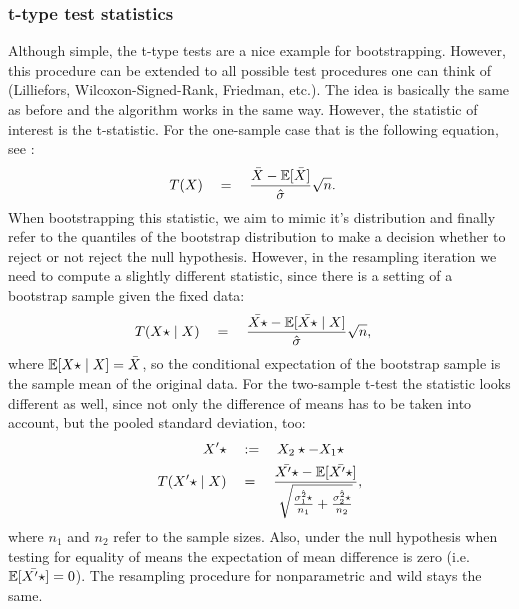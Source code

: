 	\subsubsection*{t-type test statistics}
Although simple, the t-type tests are a nice example for bootstrapping. However, this procedure can be extended to all possible test procedures one can think of (Lilliefors, Wilcoxon-Signed-Rank, Friedman, etc.). The idea is basically the same as before and the algorithm works in the same way. However, the statistic of interest is the t-statistic. For the one-sample case that is the following equation, see \citet{t}:
\begin{align*}
	T(X) \quad &= \quad \frac{\bar{X} - \mathbb{E}[\bar{X}]}{\hat{\sigma}}\sqrt{n}.
\end{align*}
When bootstrapping this statistic, we aim to mimic it's distribution and finally refer to the quantiles of the bootstrap distribution to make a decision whether to reject or not reject the null hypothesis. However, in the resampling iteration we need to compute a slightly different statistic, since there is a setting of a bootstrap sample given the fixed data:
\begin{align*}
	T(X\star \mid X) \quad &= \quad \frac{\bar{X\star} - \mathbb{E}[\bar{X\star} \mid X]}{\hat{\sigma}}\sqrt{n},
\end{align*}
where $\mathbb{E}[X\star \mid X] = \bar{X}$, so the conditional expectation of the bootstrap sample is the sample mean of the original data. For the two-sample t-test the statistic looks different as well, since not only the difference of means has to be taken into account, but the pooled standard deviation, too:
\begin{align*}
	X'\star \quad &:= \quad X_2\star - X_1\star \\
	T(X'\star \mid X) \quad &= \quad \frac{\bar{X'\star} - \mathbb{E}[\bar{X'\star}]}{\sqrt{\frac{\hat{\sigma_1^2\star}}{n_1} + \frac{\hat{\sigma_2^2\star}}{n_2}}},
\end{align*}
where $n_1$ and $n_2$ refer to the sample sizes. Also, under the null hypothesis when testing for equality of means the expectation of mean difference is zero (i.e. $\mathbb{E}[\bar{X'\star}] = 0$). The resampling procedure for nonparametric and wild stays the same. 

